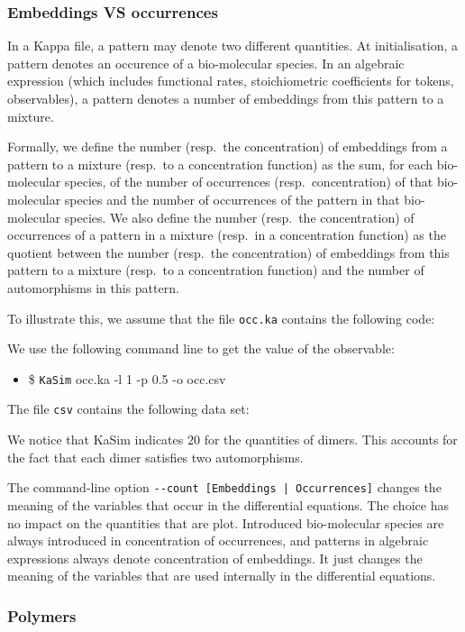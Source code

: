 \documentclass[11pt]{book}
\def\ttt#1{\texttt{#1}}
\def\ITE#1{\begin{itemize}#1\end{itemize}}
\begin{document}
  \subsubsection{Embeddings VS occurrences}

In a Kappa file, a pattern may denote two different quantities.
At initialisation, a pattern denotes an occurence of a bio-molecular species. In an algebraic expression (which includes functional rates,
stoichiometric coefficients for tokens, observables), a pattern denotes a number of embeddings from this pattern to a mixture.

Formally, we define the number (resp.~the concentration) of embeddings from a pattern to a mixture (resp.~to a concentration function) as
the sum, for each bio-molecular species,
 of the number of occurrences (resp.~concentration) of that bio-molecular species and the number of occurrences of the pattern in that bio-molecular species. We also define the number (resp.~the concentration) of occurrences of a pattern in a mixture (resp.~in a concentration function) as the quotient between the number (resp.~the concentration) of embeddings from this pattern to a mixture (resp.~to a concentration function) and the number of automorphisms in this pattern.

To illustrate this, we assume that the file \texttt{occ.ka} contains the following code:

We use the following command line to get the value of the observable:
\ITE{\item[\$] \ttt{KaSim} occ.ka -l 1 -p 0.5 -o occ.csv}

The file \texttt{csv} contains the following data set:
{\lstset{numbers=none}}
{\lstset{numbers=left}}

We notice that KaSim indicates $20$ for the quantities of dimers.
This accounts for the fact that each dimer satisfies two automorphisms.

The command-line option \texttt{-{}-count [Embeddings | Occurrences]}
changes the meaning of the variables that occur in the differential equations. The choice has no impact on the quantities that are plot. Introduced bio-molecular species are always introduced in
concentration of occurrences, and patterns in algebraic expressions always denote concentration of embeddings. It just changes the meaning of the variables that are used internally in the differential equations.

\subsubsection{Polymers}
\end{document}
